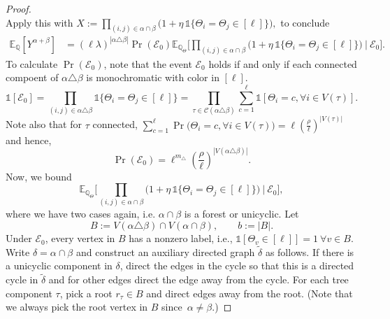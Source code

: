 \documentclass[11pt, letterpaper]{article}
\numberwithin{equation}{section}
\newcommand{\E}{\mathbb{E}}
\newcommand{\QQ}{\mathbb{Q}}
\begin{document}
\begin{proof}
\[\]
Apply this with
$
X:=\prod_{(i,j)\in \alpha \cap \beta} \big(1+\eta\,\mathds{1}\{\Theta_i=\Theta_j\in[\ell]\}\big),
$
to conclude
\begin{align}
\E_\QQ[Y^{\alpha+\beta}]
&=(\ell\lambda)^{|\alpha\triangle\beta|} 
\Pr(\mathcal E_0) 
\E_{\QQ_\Theta}\bigg[
\prod_{(i,j)\in \alpha \cap \beta} \Big(1+\eta\,\mathds{1}\{\Theta_i=\Theta_j\in[\ell]\}\Big)
\ \Big|\ \mathcal E_0\bigg]. \label{eq.in_terms_of_exp}
\end{align}
%
To calculate $\Pr(\mathcal E_0)$, note that the event $\mathcal{E}_0$ holds if and only if each connected compoent of $\alpha\triangle\beta$ is monochromatic with color in $[\ell]$.
%
\[\mathds{1}[\mathcal E_0] = \prod_{(i,j) \in \alpha \triangle \beta}\mathds{1}\{\Theta_i=\Theta_j\in[\ell]\}
= \prod_{\tau \in \mathcal{C}(\alpha \triangle \beta)} \sum_{c=1}^\ell  \mathds{1}[\Theta_i =c ,   \forall i \in V(\tau)].\]
Note also that for $\tau$ connected, $\sum_{c=1}^\ell \Pr\big( \Theta_i =c ,   \forall i \in V(\tau)\big) = \ell\left(\frac{\rho}{\ell}\right)^{|V(\tau)|} $ and hence,
%
\begin{equation}\label{eq.upperbound_PE0} \Pr(\mathcal E_0) 
=\ell^{m_{\triangle}}\left(\frac{\rho}{\ell}\right)^{|V(\alpha \triangle \beta)|}. \end{equation} 
%
Now, we bound 
\[\E_{\QQ_\Theta}\Bigg[
\prod_{(i,j)\in \alpha \cap \beta} \Big(1+\eta\,\mathds{1}\{\Theta_i=\Theta_j\in[\ell]\}\Big)
\ \Big|\ \mathcal E_0\Bigg],\]
where we have two cases again, i.e. $\alpha \cap \beta$ is a forest or unicyclic. Let
\[
B:=V(\alpha\triangle\beta)\cap V(\alpha\cap\beta),
\qquad b:=|B|.
\]
Under $\mathcal E_0$, every vertex in $B$ has a nonzero label, i.e.,
$\mathds{1}[\Theta_v \in [\ell]]=1 \ \forall v \in {B}.$ Write $\delta = \alpha \cap \beta$ and construct an auxiliary directed graph $\tilde{\delta}$ as follows. If there is a unicyclic component in $\delta$, direct the edges in the cycle so that this is a directed cycle in $\tilde{\delta}$ and for other edges direct the edge away from the cycle. For each tree component $\tau$, pick a root $r_\tau\in B$ and direct edges away from the root. (Note that we always pick the root vertex in $B$ since~$\alpha \neq \beta$.)

\end{proof}
\end{document}
